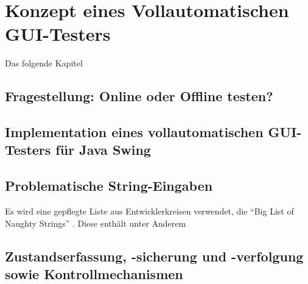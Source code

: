 \chapter{Konzept eines Vollautomatischen GUI-Testers}\label{chapter:conceptfullautoguitesting}


Das folgende Kapitel


\section{Fragestellung: Online oder Offline testen?}\label{section:offoronlinetesting}


\section{Implementation eines vollautomatischen GUI-Testers für Java Swing}\label{section:myfullautoguitest}


\section{Problematische String-Eingaben}\label{section:naughtystrings}

Es wird eine gepflegte Liste aus Entwicklerkreisen verwendet, die ``Big List of Naughty Strings'' 
\cite{website:naughty-strings}. Diese enthält unter Anderem


\section{Zustandserfassung, -sicherung und -verfolgung sowie Kontrollmechanismen}\label{section:statemonitoring}
